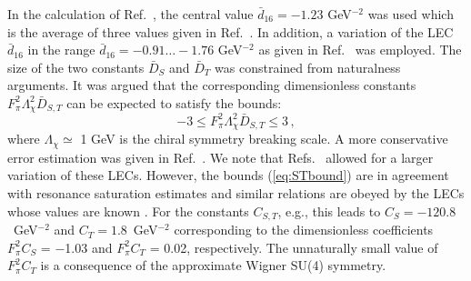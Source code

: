 \documentclass[aps,rmp,nofootinbib,twocolumn,floatfix]{revtex4}
\newcommand{\beq}{\begin{equation}}
\newcommand{\eeq}{\end{equation}}
\begin{document}
In the calculation of Ref.~\cite{Epelbaum:2002gb}, 
the central value $\bar d_{16}=-1.23$ GeV$^{-2}$ was used 
which is the average of three values given in Ref.~\cite{Fettes:2000fd}.
In addition, a variation of the LEC $\bar d_{16}$ in the range 
$\bar d_{16} = -0.91 \ldots -1.76$ GeV$^{-2}$ as given in  Ref.~\cite{Fettes:2000fd}  was
employed.  
The size of the two constants $\bar D_{S}$ and $\bar D_{T}$ was
constrained from naturalness arguments. It was argued that the 
corresponding dimensionless constants $F_\pi^2 \Lambda_\chi^2 \bar D_{S,T}$ 
can be expected to satisfy the bounds:
\beq
-3 \leq F_\pi^2 \Lambda_\chi^2 \bar D_{S,T} \leq 3\,,
\label{eq:STbound}
\eeq
where $\Lambda_\chi \simeq$ 1 GeV is the chiral symmetry breaking scale.
A more conservative error estimation was given in Ref.~\cite{Epelbaum:2002gk}. 
We note that Refs.~\cite{Beane:2001bc,Beane:2002xf} allowed for a larger 
variation of these LECs. However,
the bounds (\ref{eq:STbound}) are in agreement with resonance saturation 
estimates and similar relations are obeyed by the LECs whose values
are known \cite{Epelbaum:2001fm}.
For the constants $C_{S,T}$, e.g., this leads to
$C_{S}=-120.8$~GeV$^{-2}$ and $C_{T}=1.8$~GeV$^{-2}$ corresponding 
to the dimensionless coefficients $F_\pi^2 C_{S}$ = $-$1.03 and 
$F_\pi^2 C_{T}$ = 0.02, respectively. The unnaturally small value
of $F_\pi^2 C_{T}$ is a consequence of the approximate Wigner
SU(4) symmetry. 
\end{document}
